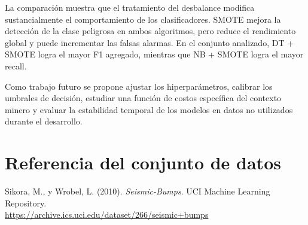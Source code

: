 \documentclass[12pt,a4paper]{article}
\begin{document}
La comparación muestra que el tratamiento del desbalance modifica sustancialmente el comportamiento de los clasificadores. SMOTE mejora la detección de la clase peligrosa en ambos algoritmos, pero reduce el rendimiento global y puede incrementar las falsas alarmas. En el conjunto analizado, DT + SMOTE logra el mayor F1 agregado, mientras que NB + SMOTE logra el mayor recall.

Como trabajo futuro se propone ajustar los hiperparámetros, calibrar los umbrales de decisión, estudiar una función de costos específica del contexto minero y evaluar la estabilidad temporal de los modelos en datos no utilizados durante el desarrollo.

\section{Referencia del conjunto de datos}

Sikora, M., y Wrobel, L. (2010). \textit{Seismic-Bumps}. UCI Machine Learning Repository.\\
\url{https://archive.ics.uci.edu/dataset/266/seismic+bumps}
\end{document}
